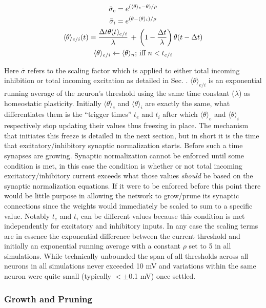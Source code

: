 \documentclass[10pt,letterpaper]{article}
\begin{document}
\begin{gather}
	\bar{\sigma}_e = e^{(\langle \theta \rangle_e - \theta)/\rho} \\
	\bar{\sigma}_i = e^{(\theta - \langle \theta \rangle_i)/\rho} \notag\\
	\langle \theta \rangle_{e/i}(t) = \frac{\Delta t \theta(t)_{e/i}}{\lambda} \,+\, \left(1 - \frac{\Delta t}{\lambda}\right)\theta(t-\Delta t) \\
	\langle \theta \rangle_{e/i} \leftarrow \langle \theta \rangle_{n} \text{;  iff } n < t_{e/i} \notag \\ 
\end{gather}

Here $\bar{\sigma}$ refers to the scaling factor which is applied to either total incoming inhibition or total incoming excitation as detailed in Sec. . $\langle \theta \rangle_{e/i}$ is an exponential running average of the neuron's threshold using the same time constant ($\lambda$) as homeostatic plasticity. Initially $\langle \theta \rangle_{e}$ and  $\langle \theta \rangle_{i}$ are exactly the same, what differentiates them is the ``trigger times'' $t_e$ and $t_i$ after which $\langle \theta \rangle_{e}$ and $\langle \theta \rangle_{i}$ respectively stop updating their values thus freezing in place. The mechanism that initiates this freeze is detailed in the next section, but in short it is the time that excitatory/inhibitory synaptic normalization starts. Before such a time synapses are growing. Synaptic normalization cannot be enforced until some condition is met, in this case the condition is whether or not total incoming excitatory/inhibitory current exceeds what those values \emph{should} be based on the synaptic normalization equations. If it were to be enforced before this point there would be little purpose in allowing the network to grow/prune its synaptic connections since the weights would immediately be scaled to sum to a specific value. Notably $t_e$ and $t_i$ can be different values because this condition is met independently for excitatory and inhibitory inputs. In any case the scaling terms are in essence the exponential difference between the current threshold and initially an exponential running average with a constant $\rho$ set to 5 in all simulations. While technically unbounded the span of all thresholds across all neurons in all simulations never exceeded 10 mV and variations within the same neuron were quite small (typically $<\pm$0.1 mV) once settled. 
	
\subsubsection*{Growth and Pruning}
\end{document}
